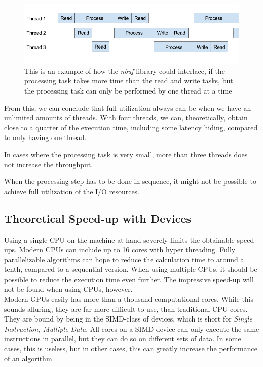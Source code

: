 \documentclass[a4paper]{article}
\newcommand{\nbuf}{\textit{nbuf} }
\begin{document}
\begin{figure}
	\begin{adjustwidth}{-0.5in}{-0.5in}
    \centering
     \includegraphics[scale=0.5]{figures/timings4.png}
  	\caption{This is an example of how the \nbuf library could interlace, if the processing task takes more time than the read and write tasks, but the processing task can only be performed by one thread at a time}
	\label{figure:timings4}
	\end{adjustwidth}
\end{figure}


From this, we can conclude that full utilization always can be when we have an unlimited amounts of threads. With four threads, we can, theoretically, obtain close to a quarter of the execution time, including some latency hiding, compared to only having one thread. 

In cases where the processing task is very small, more than three threads does not increase the throughput.

When the processing step has to be done in sequence, it might not be possible to achieve full utilization of the I/O resources.


\subsection{Theoretical Speed-up with Devices}
Using a single CPU on the machine at hand severely limits the obtainable speed-ups. Modern CPUs can include up to 16 cores with hyper threading. Fully parallelizable algorithms can hope to reduce the calculation time to around a tenth, compared to a sequential version. When using multiple CPUs, it should be possible to reduce the execution time even further. The impressive speed-up will not be found when using CPUs, however.\\

Modern GPUs easily has more than a thousand computational cores. While this sounds alluring, they are far more difficult to use, than traditional CPU cores. They are bound by being in the SIMD-class of devices, which is short for \textit{Single Instruction, Multiple Data}. All cores on a SIMD-device can only execute the same instructions in parallel, but they can do so on different sets of data. In some cases, this is useless, but in other cases, this can greatly increase the performance of an algorithm.\\
\end{document}
